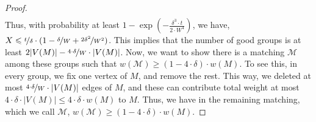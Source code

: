 \documentclass[a4paper,11pt]{article}
\newcommand{\card}[1]{|#1|}
\newcommand{\paren}[1]{\left ( #1 \right )}
\theoremstyle{definition}
\theoremstyle{definition}
\theoremstyle{definition}
\theoremstyle{definition}
\theoremstyle{definition}
\theoremstyle{definition}
\theoremstyle{definition}
\theoremstyle{definition}
\theoremstyle{definition}
\theoremstyle{definition}
\theoremstyle{definition}
\theoremstyle{definition}
\theoremstyle{definition}
\theoremstyle{definition}
\theoremstyle{definition}
\begin{document}
\begin{proof}
\begin{align*}
\end{align*}
Thus, with probability at least $1- \exp\paren{-\frac{\delta^3\cdot t}{2\cdot W^4}}$, we have, $X\leqslant \nicefrac{t}{\delta}\cdot (1-\nicefrac{\delta}{W}+\nicefrac{2\delta^2}{W^2})$. This implies that the number of good groups is at least $2\card{V(M)}-\nicefrac{4\cdot \delta}{W}\cdot \card{V(M)}$. Now, we want to show there is a matching $\mathcal{M}$ among these groups such that $w(\mathcal{M})\geqslant (1-4\cdot \delta)\cdot w(M)$. To see this, in every group, we fix one vertex of $M$, and remove the rest. This way, we deleted at most $\nicefrac{4\cdot \delta}{W}\cdot \card{V(M)}$ edges of $M$, and these can contribute total weight at most $4\cdot \delta \cdot\card{V(M)}\leqslant 4\cdot \delta \cdot w(M)$ to $M$. Thus, we have in the remaining matching, which we call $\mathcal{M}$, $w(\mathcal{M})\geqslant (1-4\cdot \delta)\cdot w(M)$. 
\end {proof}
\end{document}
